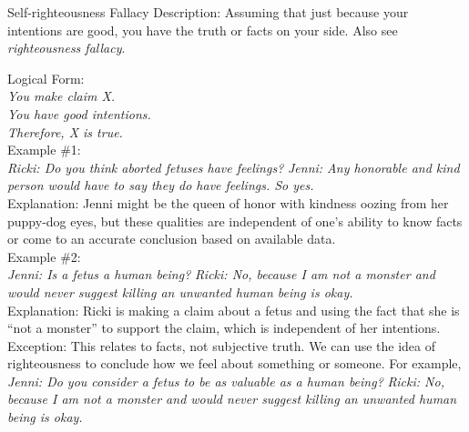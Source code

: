 \documentclass[a4paper,12pt,single,pdftex]{scrbook}
\begin{document}
Self-righteousness Fallacy
    Description: Assuming that just because your intentions are good, you have the truth or facts on your side. Also see {\it righteousness fallacy}.

    
      Logical Form:
    \\

    
      {\em You make claim X.}
    \\

    
      {\em You have good intentions.}
    \\

    
      {\em Therefore, X is true.}
    \\

    
      Example \#1:
    \\

    
      {\em Ricki: Do you think aborted fetuses have feelings?} \newline
{\em Jenni: Any honorable and kind person would have to say they do have feelings. So yes.}
    \\

    
      Explanation: Jenni might be the queen of honor with kindness oozing from her puppy-dog eyes, but these qualities are independent of one’s ability to know facts or come to an accurate conclusion based on available data.
    \\

    
      Example \#2:
    \\

    
      {\em Jenni: Is a fetus a human being?} \newline
{\em Ricki: No, because I am not a monster and would never suggest killing an unwanted human being is okay.}
    \\

    
      Explanation: Ricki is making a claim about a fetus and using the fact that she is “not a monster” to support the claim, which is independent of her intentions.
    \\

    
      Exception: This relates to facts, not subjective truth. We can use the idea of righteousness to conclude how we feel about something or someone. For example,
    \\

    
      {\em Jenni: Do you consider a fetus to be as valuable as a human being?} \newline
{\em Ricki: No, because I am not a monster and would never suggest killing an unwanted human being is okay.}
    \\
\end{document}
